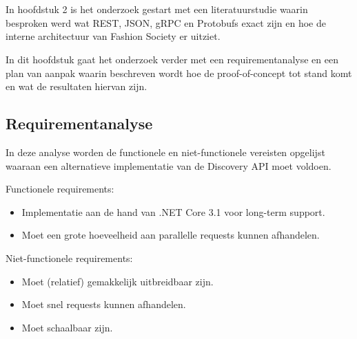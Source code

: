 
\chapter{}
\label{ch:Praktijk onderzoek}


In hoofdstuk 2 is het onderzoek gestart met een literatuurstudie waarin besproken werd wat REST, JSON, gRPC en Protobufs exact zijn en hoe de interne architectuur van Fashion Society er uitziet.

In dit hoofdstuk gaat het onderzoek verder met een requirementanalyse en een plan van aanpak waarin beschreven wordt hoe de proof-of-concept tot stand komt en wat de resultaten hiervan zijn.

\section{Requirementanalyse}
\label{sec:Requirementanalyse}

In deze analyse worden de functionele en niet-functionele vereisten opgelijst waaraan een alternatieve implementatie van de Discovery API moet voldoen.

Functionele requirements:
\begin{itemize}
    \item Implementatie aan de hand van .NET Core 3.1 voor long-term support.
    \item Moet een grote hoeveelheid aan parallelle requests kunnen afhandelen.

\end{itemize}

Niet-functionele requirements:
\begin{itemize}
    \item Moet (relatief) gemakkelijk uitbreidbaar zijn.
 \item Moet snel requests kunnen afhandelen.
     \item Moet schaalbaar zijn.
\end{itemize}



